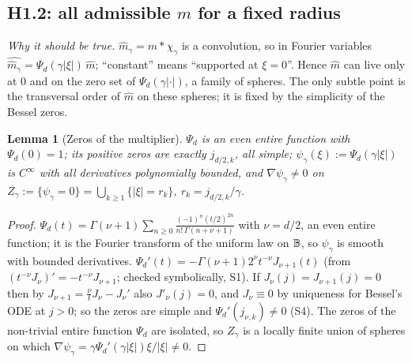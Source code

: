 \documentclass[11pt,a4paper]{article}
\numberwithin{equation}{section}
\newtheorem{lemma}[theorem]{Lemma}
\theoremstyle{definition}
\theoremstyle{remark}
\begin{document}
\subsection{H1.2: all admissible $m$ for a fixed radius}
\emph{Why it should be true.} $\hat m_\gamma=m*\chi_\gamma$ is a convolution, so in Fourier variables $\widehat{\hat m_\gamma}=\Psi_d(\gamma|\xi|)\,\hat m$; ``constant'' means ``supported at $\xi=0$''. Hence $\hat m$ can live only at $0$ and on the zero set of $\Psi_d(\gamma|\cdot|)$, a family of spheres. The only subtle point is the transversal order of $\hat m$ on these spheres; it is fixed by the simplicity of the Bessel zeros.

\begin{lemma}[Zeros of the multiplier]\label{lem:zeros}
$\Psi_d$ is an even entire function with $\Psi_d(0)=1$; its positive zeros are exactly $j_{d/2,k}$, all simple; $\psi_\gamma(\xi):=\Psi_d(\gamma|\xi|)$ is $C^\infty$ with all derivatives polynomially bounded, and $\nabla\psi_\gamma\ne0$ on $Z_\gamma:=\{\psi_\gamma=0\}=\bigcup_{k\ge1}\{|\xi|=r_k\}$, $r_k=j_{d/2,k}/\gamma$.
\end{lemma}
\begin{proof}
$\Psi_d(t)=\Gamma(\nu+1)\sum_{n\ge0}\frac{(-1)^n(t/2)^{2n}}{n!\,\Gamma(n+\nu+1)}$ with $\nu=d/2$, an even entire function; it is the Fourier transform of the uniform law on $\mathbb B$, so $\psi_\gamma$ is smooth with bounded derivatives. $\Psi_d'(t)=-\Gamma(\nu+1)2^\nu t^{-\nu}J_{\nu+1}(t)$ (from $(t^{-\nu}J_\nu)'=-t^{-\nu}J_{\nu+1}$; checked symbolically, S1). If $J_\nu(j)=J_{\nu+1}(j)=0$ then by $J_{\nu+1}=\frac\nu tJ_\nu-J_\nu'$ also $J'_\nu(j)=0$, and $J_\nu\equiv0$ by uniqueness for Bessel's ODE at $j>0$; so the zeros are simple and $\Psi_d'(j_{\nu,k})\ne0$ (S4). The zeros of the non-trivial entire function $\Psi_d$ are isolated, so $Z_\gamma$ is a locally finite union of spheres on which $\nabla\psi_\gamma=\gamma\Psi_d'(\gamma|\xi|)\xi/|\xi|\neq0$.
\end{proof}
\end{document}
